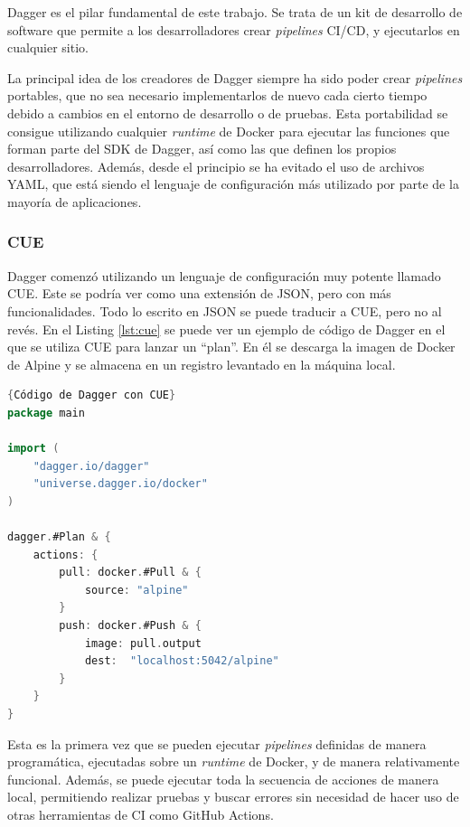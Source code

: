 Dagger es el pilar fundamental de este trabajo. Se trata de un kit de desarrollo de software que permite a los desarrolladores crear \textit{pipelines} CI/CD, y ejecutarlos en cualquier sitio.

La principal idea de los creadores de Dagger siempre ha sido poder crear \textit{pipelines} portables, que no sea necesario implementarlos de nuevo cada cierto tiempo debido a cambios en el entorno de desarrollo o de pruebas. Esta portabilidad se consigue utilizando cualquier \textit{runtime} de Docker para ejecutar las funciones que forman parte del SDK\cite{sdk} de Dagger, así como las que definen los propios desarrolladores. Además, desde el principio se ha evitado el uso de archivos YAML, que está siendo el lenguaje de configuración más utilizado por parte de la mayoría de aplicaciones.

\subsubsection*{CUE}

Dagger comenzó utilizando un lenguaje de configuración muy potente llamado CUE\cite{cue}. Este se podría ver como una extensión de JSON, pero con más funcionalidades. Todo lo escrito en JSON se puede traducir a CUE, pero no al revés. En el Listing \ref{lst:cue} se puede ver un ejemplo de código de Dagger en el que se utiliza CUE para lanzar un ``plan''. En él se descarga la imagen de Docker de Alpine y se almacena en un registro levantado en la máquina local.

\begin{lstlisting}[language=go,label=lst:cue]{Código de Dagger con CUE}
package main

import (
    "dagger.io/dagger"
    "universe.dagger.io/docker"
)

dagger.#Plan & {
    actions: {
        pull: docker.#Pull & {
            source: "alpine"
        }
        push: docker.#Push & {
            image: pull.output
            dest:  "localhost:5042/alpine"
        }
    }
}
\end{lstlisting}

Esta es la primera vez que se pueden ejecutar \textit{pipelines} definidas de manera programática, ejecutadas sobre un \textit{runtime} de Docker, y de manera relativamente funcional. Además, se puede ejecutar toda la secuencia de acciones de manera local, permitiendo realizar pruebas y buscar errores sin necesidad de hacer uso de otras herramientas de CI como GitHub Actions.

